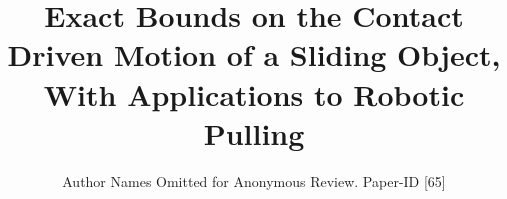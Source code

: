 \documentclass[conference]{IEEEtran}
\begin{document}
\title{\huge Exact Bounds on the Contact Driven Motion of a Sliding
  Object, With Applications to Robotic Pulling}

\author{Author Names Omitted for Anonymous Review. Paper-ID [65]}



% 


\maketitle
\end{document}
